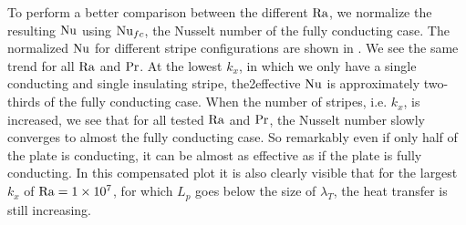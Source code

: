 To perform a better comparison between the different $\text{Ra}$, we normalize the
resulting $\text{Nu}$ using $\text{Nu}_{fc}$, the Nusselt number of the fully conducting
case.  The normalized $\text{Nu}$ for different stripe configurations are shown in
.  We see the same trend for all $\text{Ra}$ and $\text{Pr}$.  At
the lowest $k_x$, in which we only have a single conducting and single
insulating stripe, the2effective $\text{Nu}$ is approximately two-thirds of the
fully conducting case.  When the number of stripes, i.e. $k_x$, is increased,
we see that for all tested $\text{Ra}$ and $\text{Pr}$, the Nusselt number slowly
converges to almost the fully conducting case.  So remarkably even if only
half of the plate is conducting, it can be almost as effective as if the plate
is fully conducting.  In this compensated plot it is also clearly visible that
for the largest $k_x$ of $\text{Ra}=\num{1e7}$, for which $L_p$ goes below the size
of $\lambda_T$, the heat transfer is still increasing.

%
%

